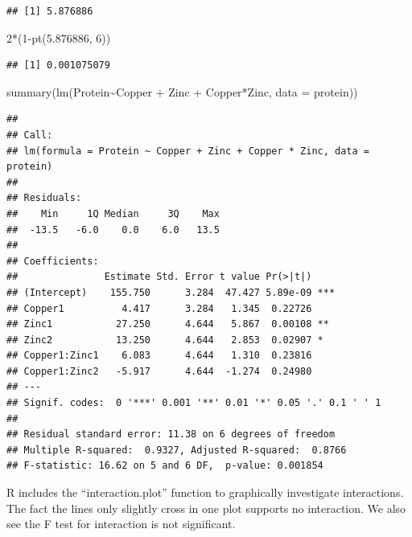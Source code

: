 \documentclass[
]{book}
\newenvironment{Shaded}{\begin{snugshade}}{\end{snugshade}}
\newcommand{\AttributeTok}[1]{\textcolor[rgb]{0.77,0.63,0.00}{#1}}
\newcommand{\DecValTok}[1]{\textcolor[rgb]{0.00,0.00,0.81}{#1}}
\newcommand{\FloatTok}[1]{\textcolor[rgb]{0.00,0.00,0.81}{#1}}
\newcommand{\FunctionTok}[1]{\textcolor[rgb]{0.00,0.00,0.00}{#1}}
\newcommand{\NormalTok}[1]{#1}
\newcommand{\SpecialCharTok}[1]{\textcolor[rgb]{0.00,0.00,0.00}{#1}}
\begin{document}
\begin{verbatim}
## [1] 5.876886
\end{verbatim}

\begin{Shaded}
\begin{Highlighting}[]
\DecValTok{2}\SpecialCharTok{*}\NormalTok{(}\DecValTok{1}\SpecialCharTok{{-}}\FunctionTok{pt}\NormalTok{(}\FloatTok{5.876886}\NormalTok{, }\DecValTok{6}\NormalTok{))}
\end{Highlighting}
\end{Shaded}

\begin{verbatim}
## [1] 0.001075079
\end{verbatim}

\begin{Shaded}
\begin{Highlighting}[]
\FunctionTok{summary}\NormalTok{(}\FunctionTok{lm}\NormalTok{(Protein}\SpecialCharTok{\textasciitilde{}}\NormalTok{Copper }\SpecialCharTok{+}\NormalTok{ Zinc }\SpecialCharTok{+}\NormalTok{ Copper}\SpecialCharTok{*}\NormalTok{Zinc, }\AttributeTok{data =}\NormalTok{ protein))}
\end{Highlighting}
\end{Shaded}

\begin{verbatim}
## 
## Call:
## lm(formula = Protein ~ Copper + Zinc + Copper * Zinc, data = protein)
## 
## Residuals:
##    Min     1Q Median     3Q    Max 
##  -13.5   -6.0    0.0    6.0   13.5 
## 
## Coefficients:
##               Estimate Std. Error t value Pr(>|t|)    
## (Intercept)    155.750      3.284  47.427 5.89e-09 ***
## Copper1          4.417      3.284   1.345  0.22726    
## Zinc1           27.250      4.644   5.867  0.00108 ** 
## Zinc2           13.250      4.644   2.853  0.02907 *  
## Copper1:Zinc1    6.083      4.644   1.310  0.23816    
## Copper1:Zinc2   -5.917      4.644  -1.274  0.24980    
## ---
## Signif. codes:  0 '***' 0.001 '**' 0.01 '*' 0.05 '.' 0.1 ' ' 1
## 
## Residual standard error: 11.38 on 6 degrees of freedom
## Multiple R-squared:  0.9327, Adjusted R-squared:  0.8766 
## F-statistic: 16.62 on 5 and 6 DF,  p-value: 0.001854
\end{verbatim}

R includes the ``interaction.plot'' function to graphically investigate interactions. The fact the lines only slightly cross in one plot supports no interaction. We also see the F test for interaction is not significant.
\end{document}
